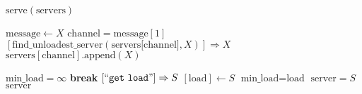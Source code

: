 \documentclass{article}
\begin{document}
\pagestyle{empty}

\newcommand{\send}{\Rightarrow}
\newcommand{\sendto}{\rightarrow}
\algrenewcommand\textproc{\textrm}

\begin{algorithmic}
  
  \algrenewcommand{}
  
  
  \State $\text{serve}(\text{servers})$
  \EndFunction

  \algrenewcommand{}

  \State $\text{message} \gets X$
  \State $\text{channel}=\text{message}[1]$
  \State $[\text{find\_unloadest\_server}(\text{servers[channel]},X)] \send X$
  \Else
  \State $\text{servers}[\text{channel}].\text{append}(X)$
  \EndIf
  \EndIf
  \EndWhile
  \EndProcedure

  \State $\text{min\_load}=\infty$
  \State \textbf{break}
  \Else
  \State $[``\mathtt{get~load}"] \send S$
  \State $[\text{load}] \gets S$
  \EndIf
  \State $\text{min\_load}=\text{load}$
  \State $\text{server}=S$
  \EndIf
  \EndFor
  \State \Return $\text{server}$
  \EndFunction

  \EndProcedure
\end{algorithmic}
\end{document}
